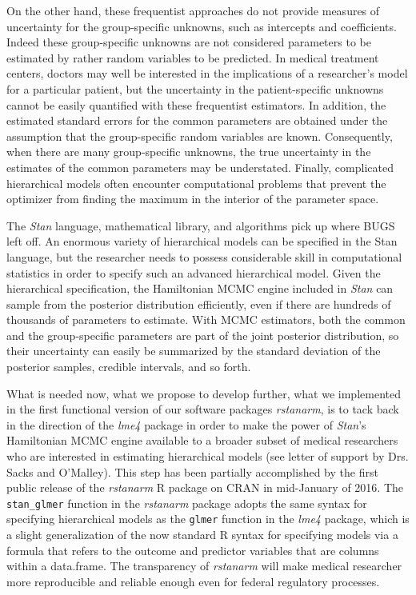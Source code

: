 \documentclass[11pt,notitlepage]{article}
\begin{document}
On the other hand, these frequentist approaches do not provide measures of uncertainty for the
group-specific unknowns, such as intercepts and coefficients. Indeed these group-specific
unknowns are not considered parameters to be estimated by rather random variables to be
predicted. In medical treatment centers, doctors may well be interested in the implications
of a researcher's model for a particular patient, but the uncertainty in the patient-specific
unknowns cannot be easily quantified with these frequentist estimators. In addition, the 
estimated standard errors for the common parameters are obtained under the assumption that
the group-specific random variables are known. Consequently, when there are many group-specific
unknowns, the true uncertainty in the estimates of the common parameters may be understated. 
Finally, complicated hierarchical models often encounter computational problems that prevent
the optimizer from finding the maximum in the interior of the parameter space.

The \textit{Stan} language, mathematical library, and algorithms pick up where BUGS left off.
An enormous variety of hierarchical models can be specified in the Stan language, but the
researcher needs to possess considerable skill in computational statistics in order to specify
such an advanced hierarchical model. Given the hierarchical specification, the Hamiltonian MCMC engine included in \textit{Stan}
can sample from the posterior distribution efficiently, even if there are hundreds of thousands
of parameters to estimate. With MCMC estimators, both the common and the group-specific parameters
are part of the joint posterior distribution, so their uncertainty can easily be summarized by
the standard deviation of the posterior samples, credible intervals, and so forth.

What is needed now, what we propose to develop further, what we implemented in the first functional version of our software packages 
\textit{rstanarm}, is to tack back in the direction of the \textit{lme4} package in order to
make the power of \textit{Stan}'s Hamiltonian MCMC engine available to a broader subset of medical
researchers who are interested in estimating hierarchical models (see letter of support 
by Drs. Sacks and O'Malley). This step has been partially accomplished
by the first public release of the \textit{rstanarm} R package on CRAN in mid-January of 2016. The 
\texttt{stan\_glmer} function in the \textit{rstanarm} package adopts the same syntax for specifying hierarchical
models as the \texttt{glmer} function in the \textit{lme4} package, which is a slight generalization
of the now standard R syntax for specifying models via a formula that refers to the outcome and 
predictor variables that are columns within a data.frame. The transparency of \textit{rstanarm} will 
make medical researcher more reproducible and reliable enough even for federal regulatory processes. 
\end{document}
